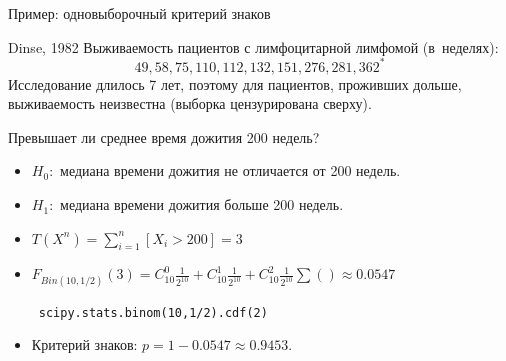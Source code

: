 \documentclass[11pt,pdf,utf8,hyperref={unicode},aspectratio=169]{beamer}
\begin{document}
\begin{frame}{Пример: одновыборочный критерий знаков}%
\begin{block}{ Dinse, 1982}
Выживаемость пациентов с лимфоцитарной лимфомой (в~неделях):
 $$49, 58, 75, 110, 112, 132, 151, 276, 281, 362^*$$
 Исследование длилось 7 лет, поэтому для пациентов, проживших дольше, выживаемость неизвестна (выборка цензурирована сверху).

 Превышает ли среднее время дожития 200 недель?
 \end{block}
 \bigskip
\begin{itemize}
   \item $H_0\colon$ медиана времени дожития не отличается от 200 недель.

   \item $H_1\colon$ медиана времени дожития больше 200 недель.

   \item $T\left(X^n\right) = \sum\limits_{i=1}^n \left[X_i>200\right] = 3$

  \item
    $F_{Bin(10,1/2)}(3)
    =C_{10}^0\frac{1}{2^{10}}
    +C_{10}^1\frac{1}{2^{10}}
        +C_{10}^2\frac{1}{2^{10}} \sum() \approx 0.0547$

  ~\hfill \alert{\texttt{scipy.stats.binom(10,1/2).cdf(2)}}

   \item Критерий знаков: $p =1-0.0547 \approx 0.9453$.
\end{itemize}
\end{frame}
\end{document}
